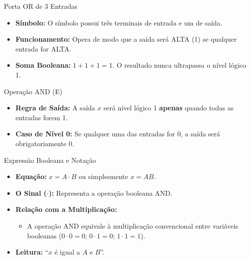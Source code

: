 \begin{frame}{Porta OR de 3 Entradas}
    \begin{itemize}
        \item \textbf{Símbolo:} O símbolo possui três terminais de entrada e um de saída.
        \item \textbf{Funcionamento:} Opera de modo que a saída será ALTA (1) se qualquer entrada for ALTA.
        \item \textbf{Soma Booleana:} $1 + 1 + 1 = 1$. O resultado nunca ultrapassa o nível lógico 1.
    \end{itemize}
    \vspace{0.5cm}
    \begin{center}

    \end{center}
\end{frame}

\begin{frame}{Operação AND (E)}
    \begin{itemize}


        \item \textbf{Regra de Saída:} A saída $x$ será nível lógico 1 \textbf{apenas} quando todas as entradas forem 1.
        \item \textbf{Caso de Nível 0:} Se qualquer uma das entradas for 0, a saída será obrigatoriamente 0.
    \end{itemize}
\end{frame}

\begin{frame}{Expressão Booleana e Notação}
    \begin{itemize}
        \item \textbf{Equação:} $x = A \cdot B$ ou simplesmente $x = AB$.
        \item \textbf{O Sinal ($\cdot$):} Representa a operação booleana AND.
        \item \textbf{Relação com a Multiplicação:}
              \begin{itemize}
                  \item A operação AND equivale à multiplicação convencional entre variáveis booleanas ($0 \cdot 0 = 0$; $0 \cdot 1 = 0$; $1 \cdot 1 = 1$).
              \end{itemize}
        \item \textbf{Leitura:} “$x$ é igual a $A$ e $B$”.
    \end{itemize}
\end{frame}

